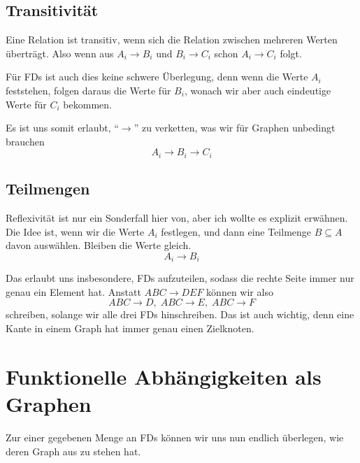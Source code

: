 \documentclass[a4paper, ngerman]{article}
\begin{document}
\subsection*{Transitivität}
Eine Relation ist transitiv,
wenn sich die Relation zwischen mehreren Werten überträgt.
Also wenn aus $A_i \to B_i$ und $B_i \to C_i$ schon $A_i \to C_i$ folgt.

Für FDs ist auch dies keine schwere Überlegung,
denn wenn die Werte $A_i$ feststehen,
folgen daraus die Werte für $B_i$,
wonach wir aber auch eindeutige Werte für $C_i$ bekommen.

Es ist uns somit erlaubt,
\enquote{$\to$} zu verketten,
was wir für Graphen unbedingt brauchen
$$
    A_i \to B_i \to C_i
$$

\subsection*{Teilmengen}
Reflexivität ist nur ein Sonderfall hier von,
aber ich wollte es explizit erwähnen.
Die Idee ist, wenn wir die Werte $A_i$ festlegen,
und dann eine Teilmenge $B \subseteq A$ davon auswählen.
Bleiben die Werte gleich.
$$
    A_i \to B_i
$$

Das erlaubt uns insbesondere,
FDs aufzuteilen, sodass die rechte Seite
immer nur genau ein Element hat.
Anstatt $ABC \to DEF$ können wir also
$$
    ABC \to D,\;
    ABC \to E,\;
    ABC \to F
$$
schreiben, solange wir alle drei FDs hinschreiben.
Das ist auch wichtig, denn eine Kante
in einem Graph hat immer genau einen Zielknoten.

\section*{Funktionelle Abhängigkeiten als Graphen}
Zur einer gegebenen Menge an FDs können
wir uns nun endlich überlegen,
wie deren Graph aus zu stehen hat.
\end{document}
